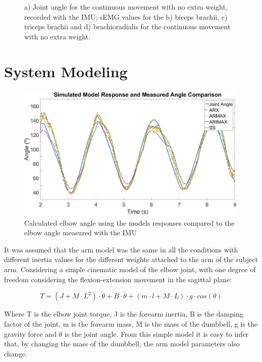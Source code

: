 \documentclass[letterpaper, 10 pt, conference]{ieeeconf}  %
\begin{document}
\begin{figure}[thpb]
      \caption{a) Joint angle for the continuous movement with no extra weight, recorded with the IMU; sEMG values for the b) biceps brachii, c) triceps brachii and d) brachioradialis for the continuous movement with no extra weight. }
      \label{Angle and EMG}
   \end{figure}


\section{System Modeling}

\begin{figure}[thpb]
      \centering
      \includegraphics[width=0.95\columnwidth]{Images/simulated_response.jpg}
      \caption{Calculated elbow angle using the models responses compared to the elbow angle measured with the IMU}
      \label{Models Comparison}
   \end{figure}

It was assumed that the arm model was the same in all the conditions with different inertia values for the different weights attached to the arm of the subject arm. Considering a simple cinematic model of the elbow joint, with one degree of freedom considering the flexion-extension movement in the sagittal plane: 

% 
% 
% 

\begin{equation}
\label{eq:arm model}
T = (J + M\cdot L^2)\cdot \ddot{\theta}  + B \cdot \dot{\theta}  + (m\cdot l + M \cdot L) \cdot g \cdot cos(\theta)
\end{equation}

Where T is the elbow joint torque, J is the forearm inertia, B is the damping factor of the joint, m is the forearm mass, M is the mass of the dumbbell, g is the gravity force and \(\theta\) is the joint angle. From this simple model it is easy to infer that, by changing the mass of the dumbbell, the arm model parameters also change.
\end{document}
